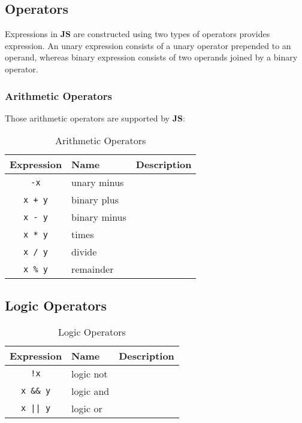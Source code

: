 \subsection {Operators}

Expressions in \textbf{\textmu JS} are constructed using two types of operators provides  expression. An unary expression consists of a unary operator prepended to an operand, whereas binary expression consists of two operands joined by a binary operator.

\subsubsection {Arithmetic Operators}

Those arithmetic operators are supported by \textbf{\textmu JS}:

\begin{table}[H]
\begin{tabular}{ c l l }
	\toprule
	{\bf Expression} & {\bf Name}  & {\bf Description} \\
	\midrule 
	{\tt -x} & unary minus & \\
	{\tt x + y} & binary plus &  \\
	{\tt x - y} & binary minus &  \\
	{\tt x * y} & times &  \\
	{\tt x / y} & divide &  \\
	{\tt x \% y} & remainder &  \\
	\bottomrule
\end{tabular}
\centering
\caption{Arithmetic Operators}
\label{tab:arith-operators}
\end{table} 

\subsection {Logic Operators}

\begin{table}[H]
\begin{tabular}{ c l l }
	\toprule
	{\bf Expression} & {\bf Name}  & {\bf Description} \\
	\midrule 
	{\tt !x} & logic not & \\
	{\tt x \&\& y} & logic and &  \\
	{\tt x || y} & logic or &  \\
	\bottomrule
\end{tabular}
\centering
\caption{Logic Operators}
\label{tab:logic-operators}
\end{table} 

